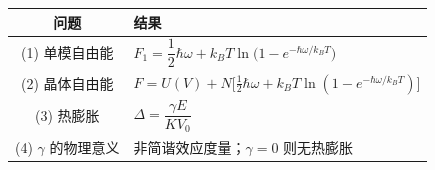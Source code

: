 \begin{formulabox}[答案汇总]
\begin{center}
\begin{tabular}{cl}
\toprule
问题 & 结果 \\
\midrule
(1) 单模自由能 & $F_1=\dfrac{1}{2}\hbar\omega+k_BT\ln\bigl(1-e^{-\hbar\omega/k_BT}\bigr)$ \\[10pt]
(2) 晶体自由能 & $F=U(V)+N\bigl[\tfrac{1}{2}\hbar\omega+k_BT\ln(1-e^{-\hbar\omega/k_BT})\bigr]$ \\[10pt]
(3) 热膨胀 & $\Delta=\dfrac{\gamma E}{KV_0}$ \\[10pt]
(4) $\gamma$ 的物理意义 & 非简谐效应度量；$\gamma=0$ 则无热膨胀 \\
\bottomrule
\end{tabular}
\end{center}
\end{formulabox}

